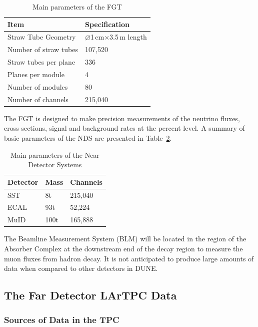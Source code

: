 \begin{table}[ht!]
\centering
\begin{tabular}{| p{2in} | p{1.5in} |}		\hline		
\textbf{Item} & \textbf{Specification} \\ \hline
Straw Tube Geometry & $\diameter$1\,cm$\times$3.5\,m length \\ \hline
Number of straw tubes & 107,520\\ \hline
Straw tubes per plane & 336 \\ \hline
Planes per module & 4 \\ \hline
Number of modules & 80 \\ \hline
Number of channels & 215,040 \\ \hline
\end{tabular}
\caption{Main parameters of the FGT}
\label{tab:fgt-params}
\end{table}

The FGT is designed to make precision measurements of the neutrino
fluxes, cross sections, signal and background rates at the percent level. A summary of basic parameters of the
NDS are presented in Table~\ref{tab:nds-params}.
\begin{table}[ht!]
\centering
\begin{tabular}{| p{1in} | p{1in} | p{1in} |}		\hline		
\textbf{Detector} & \textbf{Mass} & \textbf{Channels} \\ \hline
SST & 8t & 215,040 \\ \hline
ECAL & 93t & 52,224 \\ \hline
MuID & 100t & 165,888 \\ \hline
\end{tabular}
\caption{Main parameters of the Near Detector Systems}
\label{tab:nds-params}
\end{table}

The Beamline Measurement System (BLM) will be located in the region of the Absorber Complex
at the downstream end of the decay region to measure the muon fluxes from hadron decay.
It is not anticipated to produce large amounts of data when compared to other detectors in DUNE.

\subsection{The Far Detector LArTPC Data}
\label{sec:fd-data-overview}
\subsubsection{Sources of Data in the TPC}

